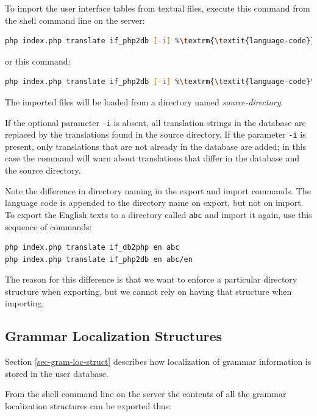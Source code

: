 \documentclass[11pt,oneside,a4paper]{memoir}
\begin{document}
To import the user interface tables from textual files, execute this command from the shell command
line on the server:

\begin{lstlisting}[language=bash,basicstyle={\ttfamily}]
php index.php translate if_php2db [-i] %\textrm{\textit{language-code}}% %\textrm{\textit{source-directory}}%
\end{lstlisting}


\noindent
or this command:

\begin{lstlisting}[language=bash,basicstyle={\ttfamily}]
php index.php translate if_php2db [-i] %\textrm{\textit{language-code}\_\textit{variant}}% %\textrm{\textit{source-directory}}%
\end{lstlisting}

The imported files will be loaded from a directory named \emph{source-directory}.

If the optional parameter \texttt{-i} is absent, all translation strings in the database are
replaced by the translations found in the source directory. If the parameter \texttt{-i} is present,
only translations that are not already in the database are added; in this case the command will warn
about translations that differ in the database and the source directory.

Note the difference in directory naming in the export and import commands. The language code is
appended to the directory name on export, but not on import. To export the English
texts to a directory called \texttt{abc} and import it again, use this sequence of commands:

\begin{lstlisting}[language=bash,basicstyle={\ttfamily}]
php index.php translate if_db2php en abc
php index.php translate if_php2db en abc/en
\end{lstlisting}

The reason for this difference is that we want to enforce a particular directory structure when
exporting, but we cannot rely on having that structure when importing.

\subsection{Grammar Localization Structures}

Section \ref{sec-gram-loc-struct} describes how localization of grammar information is stored in the
user database.

From the shell command line on the server the contents of all the grammar localization structures can be exported
thus:
\end{document}
